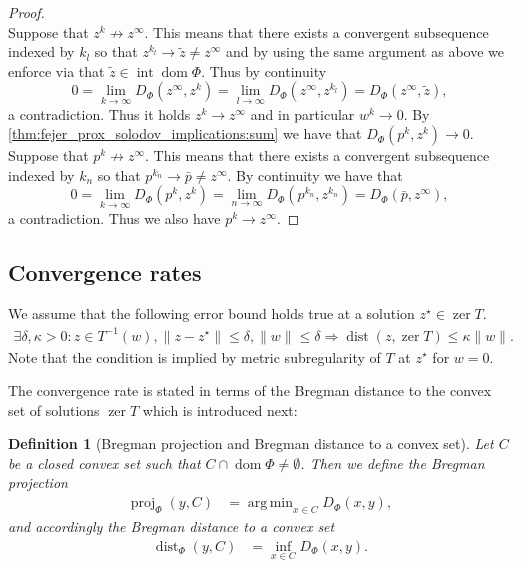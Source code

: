 \documentclass[11pt,onecolumn]{article}
\DeclareMathOperator*{\argmin}{arg\,min}
\DeclareMathOperator{\dom}{dom}
\DeclareMathOperator{\intr}{int}
\DeclareMathOperator{\proj}{proj}
\DeclareMathOperator{\zer}{zer}
\DeclareMathOperator{\dist}{dist}
\newtheorem{definition}[definition]{Definition}
\theoremstyle{remark}
\begin{document}
\begin{proof}
$$$$
Suppose that $z^k \not \to z^\infty$. This means that there exists a convergent subsequence indexed by $k_l$ so that $z^{k_l} \to \tilde z \neq z^\infty$ and by using the same argument as above we enforce via \cite[Theorem 3.8(i)]{bauschke1997legendre} that $\tilde z \in \intr \dom \Phi$.
Thus by continuity
$$
0=\lim_{k \to \infty} D_\Phi(z^\infty, z^{k}) = \lim_{l \to \infty} D_\Phi(z^\infty, z^{k_l}) =D_\Phi(z^\infty, \tilde z),
$$
a contradiction.
Thus it holds $z^k \to z^\infty$ and in particular $w^k \to 0$.
By \cref{thm:fejer_prox_solodov_implications:sum} we have that $D_\Phi(p^k, z^{k}) \to 0$. Suppose that $p^k \not \to z^\infty$. This means that there exists a convergent subsequence indexed by $k_n$ so that $p^{k_n} \to \bar p \neq z^\infty$. By continuity we have that
$$
0=\lim_{k \to \infty} D_\Phi(p^k, z^{k}) = \lim_{n \to \infty} D_\Phi(p^{k_n}, z^{k_n}) =D_\Phi(\bar p, z^\infty),
$$
a contradiction. Thus we also have $p^k \to z^\infty$.
\end{proof}

\subsection{Convergence rates} \label{sec:rates_ppa}
We assume that the following error bound holds true at a solution $z^\star \in \zer T$.
\begin{align} \label{eq:error_bound}
\exists \delta, \kappa > 0 : z \in T^{-1}(w), \|z - z^\star\| \leq \delta, \|w\| \leq \delta \Rightarrow \dist(z,\zer T) \leq \kappa \|w\|.
\end{align}
Note that the condition is implied by metric subregularity of $T$ at $z^\star$ for $w=0$.

The convergence rate is stated in terms of the Bregman distance to the convex set of solutions $\zer T$ which is introduced next:
\begin{definition}[Bregman projection and Bregman distance to a convex set]
Let $C$ be a closed convex set such that $C \cap \dom \Phi \neq \emptyset$. Then we define the Bregman projection
\begin{align}
\proj_\Phi(y, C) &= \argmin_{x \in C} D_\Phi(x, y),
\end{align}
and accordingly the Bregman distance to a convex set
\begin{align}
\dist_\Phi(y, C) &= \inf_{x \in C} D_\Phi(x, y).
\end{align}
\end{definition}
\end{document}

